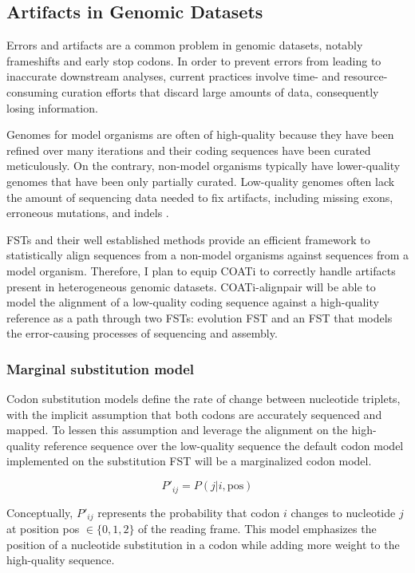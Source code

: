\subsection{Artifacts in Genomic Datasets}

Errors and artifacts are a common problem in genomic datasets, notably
frameshifts and early stop codons.
In order to prevent errors from leading to inaccurate downstream analyses,
current practices involve time- and resource-consuming curation efforts that
discard large amounts of data, consequently losing information.

Genomes for model organisms are often of high-quality because they have been
refined over many iterations and their coding sequences have been curated
meticulously.
On the contrary, non-model organisms typically have lower-quality genomes that
have been only partially curated.
Low-quality genomes often lack the amount of sequencing data needed to fix
artifacts, including missing exons, erroneous mutations, and indels
.

FSTs and their well established methods provide an efficient framework to
statistically align sequences from a non-model organisms against sequences from
a model organism.
Therefore, I plan to equip COATi to correctly handle artifacts present in
heterogeneous genomic datasets.
COATi-alignpair will be able to model the alignment of a low-quality coding
sequence against a high-quality reference as a path through two FSTs: evolution
FST and an FST that models the error-causing processes of sequencing and
assembly.

\subsubsection{Marginal substitution model}

Codon substitution models define the rate of change between nucleotide triplets,
with the implicit assumption that both codons are accurately sequenced and
mapped.
To lessen this assumption and leverage the alignment on the high-quality
reference sequence over the low-quality sequence the default codon model
implemented on the substitution FST will be a marginalized codon model.

\[ P'_{ij} = P(j | i, \text{pos}) \]

Conceptually, $P'_{ij}$ represents the probability that codon $i$ changes to
nucleotide $j$ at position pos $\in \{0,1,2\}$ of the reading frame.
This model emphasizes the position of a nucleotide substitution in a codon while
adding more weight to the high-quality sequence.

